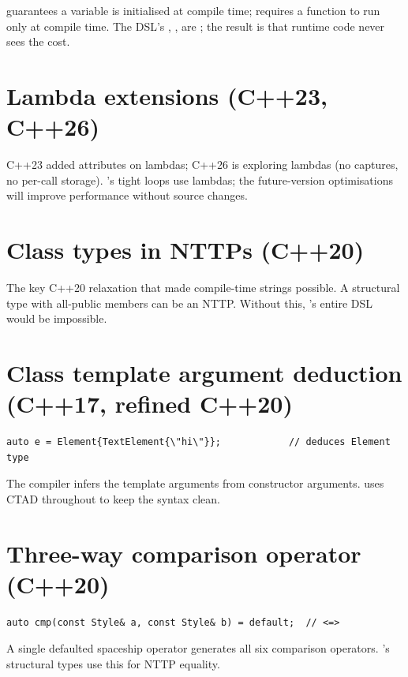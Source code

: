  guarantees a variable is initialised at
compile time;  requires a function to run only
at compile time. The DSL's , ,
 are ; the result is
that runtime code never sees the cost.

\section{Lambda extensions (C++23, C++26)}

C++23 added attributes on lambdas; C++26 is exploring
 lambdas (no captures, no per-call storage).
\maya{}'s tight loops use lambdas; the future-version
optimisations will improve performance without source changes.

\section{Class types in NTTPs (C++20)}

The key C++20 relaxation that made compile-time strings
possible. A structural type with all-public members can be an
NTTP. Without this, \maya{}'s entire DSL would be impossible.

\section{Class template argument deduction (C++17, refined C++20)}

\begin{lstlisting}
auto e = Element{TextElement{\"hi\"}};            // deduces Element type
\end{lstlisting}

The compiler infers the template arguments from constructor
arguments. \maya{} uses CTAD throughout to keep the syntax
clean.

\section{Three-way comparison operator (C++20)}

\begin{lstlisting}
auto cmp(const Style& a, const Style& b) = default;  // <=>
\end{lstlisting}

A single defaulted spaceship operator generates all six
comparison operators. \maya{}'s structural types use this for
NTTP equality.

